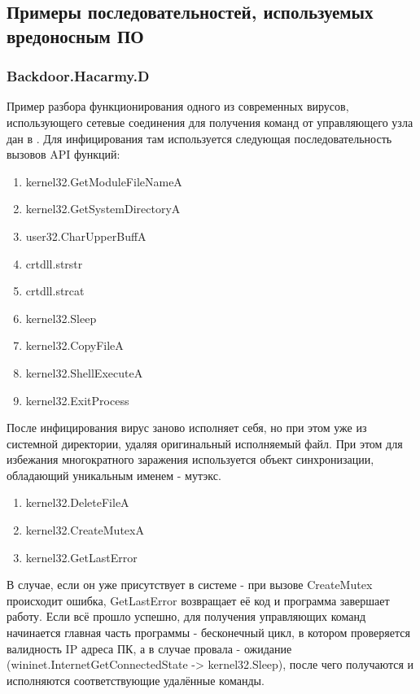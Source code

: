 \subsection {Примеры последовательностей, используемых вредоносным ПО}
\subsubsection {Backdoor.Hacarmy.D}
Пример разбора функционирования одного из современных вирусов, использующего сетевые соединения для
получения команд от управляющего узла дан в \cite{REVERSING}. Для инфицирования там используется следующая последовательность вызовов API функций:
\begin {enumerate}
	\item kernel32.GetModuleFileNameA
	\item kernel32.GetSystemDirectoryA
	\item user32.CharUpperBuffA
	\item crtdll.strstr
	\item crtdll.strcat
	\item kernel32.Sleep
	\item kernel32.CopyFileA
	\item kernel32.ShellExecuteA
	\item kernel32.ExitProcess
\end {enumerate}
После инфицирования вирус заново исполняет себя, но при этом уже из системной директории, удаляя оригинальный исполняемый файл. При этом для избежания многократного заражения используется объект синхронизации, обладающий уникальным именем - мутэкс.
\begin {enumerate}
	\item kernel32.DeleteFileA
	\item kernel32.CreateMutexA
	\item kernel32.GetLastError
\end {enumerate}
В случае, если он уже присутствует в системе - при вызове CreateMutex происходит ошибка, GetLastError возвращает её код и программа завершает работу. Если всё прошло успешно, для получения управляющих команд начинается главная часть программы - бесконечный цикл, в котором проверяется валидность IP адреса ПК, а в случае провала - ожидание (wininet.InternetGetConnectedState -> kernel32.Sleep), после чего получаются и исполняются соответствующие удалённые команды.
